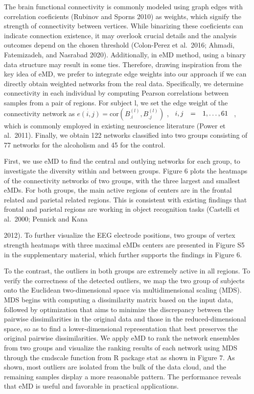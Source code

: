 \documentclass[
  10
]{article}
\begin{document}
The brain functional connectivity is commonly modeled using graph edges
with correlation coeficients (Rubinov and Sporns 2010) as weights, which
signify the strength of connectivity between vertices. While binarizing
these coeficients can indicate connection existence, it may overlook
crucial details and the analysis outcomes depend on the chosen threshold
(Colon-Perez et al.~2016; Ahmadi, Fatemizadeh, and Nasrabad 2020).
Additionally, in eMD method, using a binary data structure may result in
some ties. Therefore, drawing inspiration from the key idea of eMD, we
prefer to integrate edge weights into our approach if we can directly
obtain weighted networks from the real data. Specifically, we determine
connectivity in each individual by computing Pearson correlations
between samples from a pair of regions. For subject l, we set the edge
weight of the connectivity network as
\(\dot { e ( i , j ) } = \mathrm { c o r } ( B _ { . i } ^ { ( l ) } , B _ { . j } ^ { ( l ) } )\)
,
\(\begin{array} { r c l } { i , j } & { = } & { 1 , \ldots , 6 1 } \end{array}\)
, which is commonly employed in existing neuroscience literature (Power
et al.~2011). Finally, we obtain 122 networks classified into two groups
consisting of 77 networks for the alcoholism and 45 for the control.

First, we use eMD to find the central and outlying networks for each
group, to investigate the diversity within and between groups. Figure 6
plots the heatmaps of the connectivity networks of two groups, with the
three largest and smallest eMDs. For both groups, the main active
regions of centers are in the frontal related and parietal related
regions. This is consistent with existing findings that frontal and
parietal regions are working in object recognition tasks (Castelli et
al.~2000; Pennick and Kana

2012). To further visualize the EEG electrode positions, two groups of
vertex strength heatmaps with three maximal eMDs centers are presented
in Figure S5 in the supplementary material, which further supports the
findings in Figure 6.

To the contrast, the outliers in both groups are extremely active in all
regions. To verify the correctness of the detected outliers, we map the
two group of subjects onto the Euclidean two-dimensional space via
multidimensional scaling (MDS). MDS begins with computing a
dissimilarity matrix based on the input data, followed by optimization
that aims to minimize the discrepancy between the pairwise
dissimilarities in the original data and those in the
reduced-dimensional space, so as to find a lower-dimensional
representation that best preserves the original pairwise
dissimilarities. We apply eMD to rank the network ensembles from two
groups and visualize the ranking results of each network using MDS
through the cmdscale function from R package stat as shown in Figure 7.
As shown, most outliers are isolated from the bulk of the data cloud,
and the remaining samples display a more reasonable pattern. The
performance reveals that eMD is useful and favorable in practical
applications.
\end{document}

